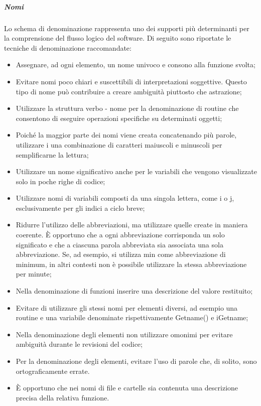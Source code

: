 \subparagraph{Nomi}
Lo schema di denominazione rappresenta uno dei supporti più determinanti per la comprensione del flusso logico del software. 
Di seguito sono riportate le tecniche di denominazione raccomandate:
\begin{itemize} 
\item
Assegnare, ad ogni elemento, un nome univoco e consono alla funzione svolta; 
\item
Evitare nomi poco chiari e suscettibili di interpretazioni soggettive. Questo tipo di nome può contribuire a creare ambiguità piuttosto che astrazione;
\item
Utilizzare la struttura verbo - nome per la denominazione di routine che consentono di eseguire operazioni specifiche su determinati oggetti;
\item
Poiché la maggior parte dei nomi viene creata concatenando più parole, utilizzare i una combinazione di caratteri maiuscoli e minuscoli per semplificarne la lettura;
\item
Utilizzare un nome significativo anche per le variabili che vengono visualizzate solo in poche righe di codice;
\item
Utilizzare nomi di variabili composti da una singola lettera, come i o j, esclusivamente per gli indici a ciclo breve;
\item
Ridurre l'utilizzo delle abbreviazioni, ma utilizzare quelle create in maniera coerente. È opportuno che a ogni abbreviazione corrisponda un solo significato e che a ciascuna parola abbreviata sia associata una sola abbreviazione. Se, ad esempio, si utilizza min come abbreviazione di minimum, in altri contesti non è possibile utilizzare la stessa abbreviazione per minute;
\item
Nella denominazione di funzioni inserire una descrizione del valore restituito;
\item
Evitare di utilizzare gli stessi nomi per elementi diversi, ad esempio una routine e una variabile denominate rispettivamente Getname() e iGetname;
\item
Nella denominazione degli elementi non utilizzare omonimi per evitare ambiguità durante le revisioni del codice;
\item
Per la denominazione degli elementi, evitare l'uso di parole che, di solito, sono ortograficamente errate.
\item
È opportuno che nei nomi di file e cartelle sia contenuta una descrizione precisa della relativa funzione.
\end{itemize}


